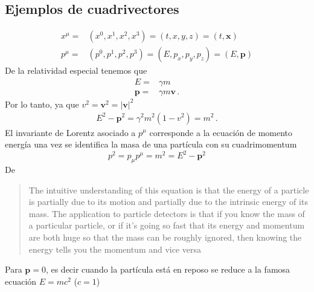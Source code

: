 \subsection{Ejemplos de cuadrivectores}
\begin{align}
    x^\mu=&(x^0,x^1,x^2,x^3)=(t,x,y,z)=(t,\mathbf{x})\\
  p^\mu=&(p^0,p^1,p^2,p^3)=(E,p_x,p_y,p_z)=(E,\mathbf{p})
\end{align}
De la relatividad especial tenemos que
\begin{align}
  E=&\gamma m \nonumber\\
  \mathbf{p}=&\gamma m\mathbf{v}\,.
\end{align}
Por lo tanto, ya que $v^2=\mathbf{v}^2=|\mathbf{v}|^2$
\begin{align}
  E^2-\mathbf{p}^2=\gamma^2m^2(1-v^2)=m^2\,.
\end{align}
El invariante de Lorentz asociado a $p^\mu$ corresponde a la ecuación de momento energía una vez se identifica la masa de una partícula con su cuadrimomentum
\begin{equation}
  p^2=p_\mu p^\mu=m^2=E^2-\mathbf{p}^2
\end{equation}
De \cite{uslhcblog}
\begin{quote}
  The intuitive understanding of this equation is that the energy of a particle is partially due to its motion and partially due to the intrinsic energy of its mass.  The application to particle detectors is that if you know the mass of a particular particle, or if it’s going so fast that its energy and momentum are both huge so that the mass can be roughly ignored, then knowing the energy tells you the momentum and vice versa
\end{quote}

Para $\mathbf{p}=0$, es decir cuando la partícula está en reposo se reduce a la famosa ecuación $E=m c^2$ ($c=1$)

